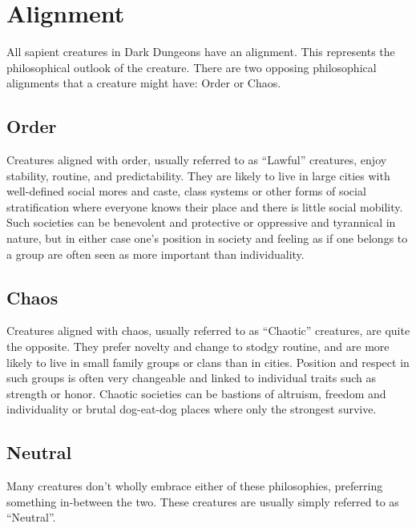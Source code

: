 \chapter[red]{Alignment}
\label{chap:Alignment}
\thispagestyle{plain}

\begin{multicols*}{2}
All sapient creatures in Dark Dungeons have an alignment. This represents the philosophical outlook of the creature. There are two opposing philosophical alignments that a creature might have: Order or Chaos.
\section{Order}\label{sec:Order}
Creatures aligned with order, usually referred to as “Lawful” creatures, enjoy stability, routine, and predictability. They are likely to live in large cities with well-defined social mores and caste, class systems or other forms of social stratification where everyone knows their place and there is little social mobility. Such societies can be benevolent and protective or oppressive and tyrannical in nature, but in either case one’s position in society and feeling as if one belongs to a group are often seen as more important than individuality.
\section{Chaos}\label{sec:Chaos}
Creatures aligned with chaos, usually referred to as “Chaotic” creatures, are quite the opposite. They prefer novelty and change to stodgy routine, and are more likely to live in small family groups or clans than in cities. Position and respect in such groups is often very changeable and linked to individual traits such as strength or honor. Chaotic societies can be bastions of altruism, freedom and individuality or brutal dog-eat-dog places where only the strongest survive.
\section{Neutral}\label{sec:Neutral}
Many creatures don’t wholly embrace either of these philosophies, preferring something in-between the two. These creatures are usually simply referred to as “Neutral”.
\end{multicols*}

